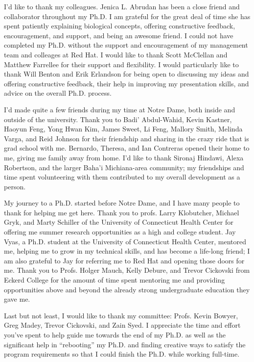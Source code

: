 \begin{acknowledge}
  I'd like to thank my colleagues.  Jenica L. Abrudan has been a close friend and collaborator throughout my Ph.D.  I am grateful for the great deal of time she has spent patiently explaining biological concepts, offering constructive feedback, encouragement, and support, and being an awesome friend.  I could not have completed my Ph.D. without the support and encouragement of my management team and colleages at Red Hat.  I would like to thank Scott McClellan and Matthew Farrellee for their support and flexibility.  I would particularly like to thank Will Benton and Erik Erlandson for being open to discussing my ideas and offering constructive feedback, their help in improving my presentation skills, and advice on the overall Ph.D. process.

  I'd made quite a few friends during my time at Notre Dame, both inside and outside of the university.  Thank you to Badi' Abdul-Wahid, Kevin Kastner, Haoyun Feng, Yong Hwan Kim, James Sweet, Li Feng, Mallory Smith, Melinda Varga, and Reid Johnson for their friendship and sharing in the crazy ride that is grad school with me.  Bernardo, Theresa, and Ian Contreras opened their home to me, giving me family away from home. I'd like to thank Sironaj Hindawi, Alexa Robertson, and the larger Baha'i Michiana-area community; my friendships and time spent volunteering with them contributed to my overall development as a person.

  My journey to a Ph.D. started before Notre Dame, and I have many people to thank for helping me get here.  Thank you to profs. Larry Klobutcher, Michael Gryk, and Marty Schiller of the University of Connecticut Health Center for offering me summer research opportunities as a high and college student.  Jay Vyas, a Ph.D. student at the University of Connecticut Health Center, mentored me, helping me to grow in my technical skills, and has become a life-long friend; I am also grateful to Jay for referring me to Red Hat and opening those doors for me.  Thank you to Profs. Holger Mauch, Kelly Debure, and Trevor Cickovski from Eckerd College for the amount of time spent mentoring me and providing opportunities above and beyond the already strong undergraduate education they gave me.

  Last but not least, I would like to thank my committee: Profs. Kevin Bowyer, Greg Madey, Trevor Cickovski, and Zain Syed.  I appreciate the time and effort you've spent to help guide me towards the end of my Ph.D. as well as the significant help in ``rebooting'' my Ph.D. and finding creative ways to satisfy the program requirements so that I could finish the Ph.D. while working full-time.
  
\end{acknowledge}
